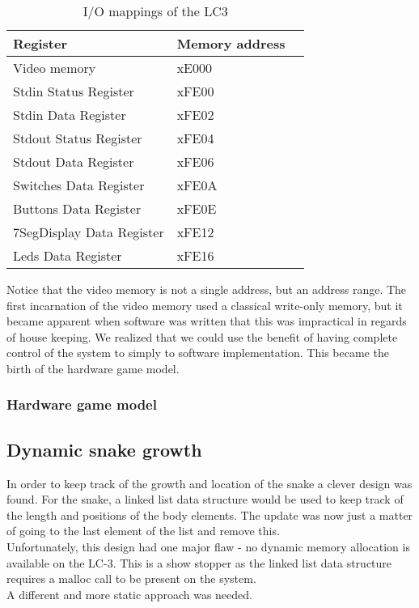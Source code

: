 \documentclass{acm_proc_article-sp}
\begin{document}
\begin{table}[h]
\centering
    \begin{tabular}{ | l | l | l |}
    \hline
     Register & Memory address \\ \hline 
    \hline
    Video memory           & xE000  \\ \hline
    Stdin Status Register  & xFE00  \\ \hline
    Stdin Data Register    & xFE02  \\ \hline
    Stdout Status Register & xFE04  \\ \hline
    Stdout Data Register   & xFE06  \\ \hline
    Switches Data Register & xFE0A  \\ \hline
    Buttons Data Register  & xFE0E  \\ \hline
    7SegDisplay Data Register  & xFE12  \\ \hline
    Leds Data Register  & xFE16  \\ \hline
    \end{tabular}
\caption{I/O mappings of the LC3}
\label{table:io_mappings}
\end{table}
Notice that the video memory is not a single address, but an address range. The first incarnation of the video memory used a classical write-only memory, but it became apparent when software was written that this was impractical in regards of house keeping. We realized that we could use the benefit of having complete control of the system to simply to software implementation. This became the birth of the hardware game model.

\subsubsection{Hardware game model}

\subsection{Dynamic snake growth}
In order to keep track of the growth and location of the snake a clever design was found. For the snake, a linked list data structure would be used to keep track of the length and positions of the body elements. The update was now just a matter of going to the last element of the list and remove this.\\
Unfortunately, this design had one major flaw - no dynamic memory allocation is available on the LC-3. This is a show stopper as the linked list data structure requires a malloc call to be present on the system.\\
A different and more static approach was needed.
\end{document}
